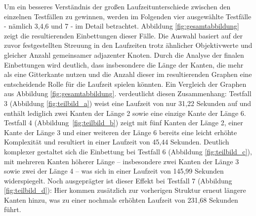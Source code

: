 \documentclass[bachelor, german]{algothesis}
\begin{document}
Um ein besseres Verständnis der großen Laufzeitunterschiede zwischen den einzelnen Testfällen zu gewinnen, werden im Folgenden vier ausgewählte Testfälle - nämlich 3,4,6 und 7 - im Detail betrachtet. Abbildung \ref{fig:gesamtabbildung} zeigt die resultierenden Einbettungen dieser Fälle. Die Auswahl basiert auf der zuvor festgestellten Streuung in den Laufzeiten trotz ähnlicher Objektivwerte und gleicher Anzahl gemeinsamer adjazenter Knoten. Durch die Analyse der finalen Einbettungen wird deutlich, dass insbesondere die Länge der Kanten, die mehr als eine Gitterkante nutzen und  die Anzahl dieser im resultierenden Graphen eine entscheidende Rolle für die Laufzeit spielen könnten.\newline 
Ein Vergleich der Graphen aus Abbildung \ref{fig:gesamtabbildung}. verdeutlicht diesen Zusammenhang: Testfall 3 (Abbildung \ref{fig:teilbild_a}) weist eine Laufzeit von nur 31,22 Sekunden auf und enthält lediglich zwei Kanten der Länge 2 sowie eine einzige Kante der Länge 6. Testfall 4 (Abbildung~\ref{fig:teilbild_b}) zeigt mit fünf Kanten der Länge 2, einer Kante der Länge 3 und einer weiteren der Länge 6 bereits eine leicht erhöhte Komplexität und resultiert in einer Laufzeit von 45,44 Sekunden. Deutlich komplexer gestaltet sich die Einbettung bei Testfall 6 (Abbildung \ref{fig:teilbild_c}), mit mehreren Kanten höherer Länge – insbesondere zwei Kanten der Länge 3 sowie zwei der Länge 4 – was sich in einer Laufzeit von 145,99 Sekunden widerspiegelt. Noch ausgeprägter ist dieser Effekt bei Testfall 7 (Abbildung \ref{fig:teilbild_d}): Hier kommen zusätzlich zur vorherigen Struktur erneut längere Kanten hinzu, was zu einer nochmals erhöhten Laufzeit von 231,68 Sekunden führt.
\end{document}
